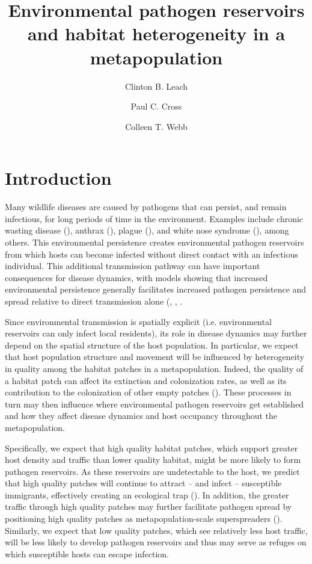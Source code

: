 \documentclass{svjour3}
\begin{document}
\title{Environmental pathogen reservoirs and habitat heterogeneity in a metapopulation}

\author{Clinton B. Leach \and Paul C. Cross \and Colleen T. Webb}




\maketitle

\section{Introduction}
\label{intro}

Many wildlife diseases are caused by pathogens that can persist, and remain infectious, for long periods of time in the environment.  Examples include chronic wasting disease (\cite{Miller2006}), anthrax (\cite{Dragon1995}), plague (\cite{Eisen2008}), and white nose syndrome (\cite{Lindner2011}), among others.  This environmental persistence creates environmental pathogen reservoirs from which hosts can become infected without direct contact with an infectious individual.  This additional transmission pathway can have important consequences for disease dynamics, with models showing that increased environmental persistence generally facilitates increased pathogen persistence and spread relative to direct transmission alone (\cite{Almberg2011}, \cite{Sharp2011}, \cite{Breban2009}. 

Since environmental transmission is spatially explicit (i.e. environmental reservoirs can only infect local residents), its role in disease dynamics may further depend on the spatial structure of the host population.  In particular, we expect that host population structure and movement will be influenced by heterogeneity in quality among the habitat patches in a metapopulation.  Indeed, the quality of a habitat patch can affect its extinction and colonization rates, as well as its contribution to the colonization of other empty patches (\cite{Moilanen1998}).  These processes in turn may then influence where environmental pathogen reservoirs get established and how they affect disease dynamics and host occupancy throughout the metapopulation.  

Specifically, we expect that high quality habitat patches, which support greater host density and traffic than lower quality habitat, might be more likely to form pathogen reservoirs.  As these reservoirs are undetectable to the host, we predict that high quality patches will continue to attract -- and infect -- susceptible immigrants, effectively creating an ecological trap (\cite{Almberg2011}).  In addition, the greater traffic through high quality patches may further facilitate pathogen spread by positioning high quality patches as metapopulation-scale superspreaders (\cite{Paull2012}).  Similarly, we expect that low quality patches, which see relatively less host traffic, will be less likely to develop pathogen reservoirs and thus may serve as refuges on which susceptible hosts can escape infection.  
\end{document}
